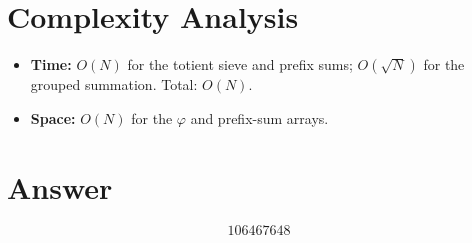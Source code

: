 \documentclass[12pt]{article}
\begin{document}
\section{Complexity Analysis}

\begin{itemize}
\item \textbf{Time:} $O(N)$ for the totient sieve and prefix sums; $O(\sqrt{N})$ for the grouped summation. Total: $O(N)$.
\item \textbf{Space:} $O(N)$ for the $\varphi$ and prefix-sum arrays.
\end{itemize}

\section{Answer}

\[
\boxed{106467648}
\]
\end{document}
